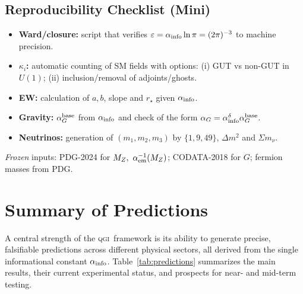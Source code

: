 \documentclass{article}
\numberwithin{equation}{section}
\theoremstyle{plain}
\theoremstyle{definition}
\theoremstyle{remark}
\newcommand{\qgi}{\textsc{qgi}}
\begin{document}
\subsection{Reproducibility Checklist (Mini)}
\label{subsec:repro_checklist}
\begin{itemize}
\item \textbf{Ward/closure:} script that verifies $\varepsilon=\alpha_{\rm info}\ln\pi=(2\pi)^{-3}$ to machine precision.
\item \textbf{$\kappa_i$:} automatic counting of SM fields with options: (i) GUT vs non-GUT in $U(1)$; (ii) inclusion/removal of adjoints/ghosts.
\item \textbf{EW:} calculation of $a,b$, slope and $r_\star$ given $\alpha_{\rm info}$.
\item \textbf{Gravity:} $\alpha_G^{\rm base}$ from $\alpha_{\rm info}$ and check of the form $\alpha_G=\alpha_{\rm info}^{\delta}\alpha_G^{\rm base}$.
\item \textbf{Neutrinos:} generation of $(m_1,m_2,m_3)$ by $\{1,9,49\}$, $\Delta m^2$ and $\Sigma m_\nu$.
\end{itemize}
\emph{Frozen} inputs: PDG-2024 for $M_Z,\ \alpha_{\rm em}^{-1}(M_Z)$; CODATA-2018 for $G$; fermion masses from PDG.

\section{Summary of Predictions}
\label{sec:summary}

A central strength of the \qgi\ framework is its ability to generate precise, falsifiable predictions across different physical sectors, all derived from the single informational constant $\alpha_{\rm info}$. Table~\ref{tab:predictions} summarizes the main results, their current experimental status, and prospects for near- and mid-term testing.
\end{document}
